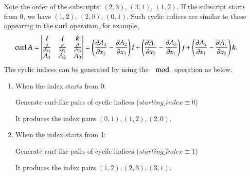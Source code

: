 \documentclass[11pt, a4paper]{article}
\begin{document}
\begin{mycomment}
  Note the order of the subscripts: $(2,3)$, $(3,1)$, $(1,2)$. If the subscript starts from 0, we
  have $(1,2)$, $(2,0)$, $(0,1)$. Such cyclic indices are similar to those appearing in the $\operatorname{curl}$
  operation, for example,
  \begin{equation}
    \operatorname{curl}\boldsymbol{A} =
    \left\vert\begin{matrix}
        \boldsymbol{i} & \boldsymbol{j} & \boldsymbol{k} \\
        \frac{\partial }{\partial x_1} & \frac{\partial }{\partial x_2} & \frac{\partial }{\partial x_3} \\
        A_1 & A_2 & A_3
    \end{matrix}\right\vert = \left( \frac{\partial A_3}{\partial x_{\textcolor{red}{2}}} - \frac{\partial A_{2}}{\partial
      x_{\textcolor{red}{3}}} \right) \boldsymbol{i} + \left( \frac{\partial A_{1}}{\partial x_{\textcolor{red}{3}}} -
    \frac{\partial A_{3}}{\partial x_{\textcolor{red}{1}}} \right) \boldsymbol{j} + \left( \frac{\partial A_{2}}{\partial
      x_{\textcolor{red}{1}}} - \frac{\partial A_{1}}{\partial x_{\textcolor{red}{2}}} \right) \boldsymbol{k}.
  \end{equation}
  The cyclic indices can be generated by using the $\mod$ operation as below.
  \begin{enumerate}
  \item When the index starts from 0:
    \begin{breakablealgorithm}
      \caption{Generate curl-like pairs of cyclic indices ($starting\_index \equiv 0$)}
      \begin{algorithmic}[1]
        \EndFor
      \end{algorithmic}
    \end{breakablealgorithm}
    It produces the index pairs $(0,1), (1,2), (2,0)$.
  \item When the index starts from 1:
    \begin{breakablealgorithm}
      \caption{Generate curl-like pairs of cyclic indices ($starting\_index \equiv 1$)}
      \begin{algorithmic}[1]
        \EndFor
      \end{algorithmic}
    \end{breakablealgorithm}
    It produces the index pairs $(1,2),(2,3),(3,1)$.
  \end{enumerate}

\end{mycomment}
\end{document}
